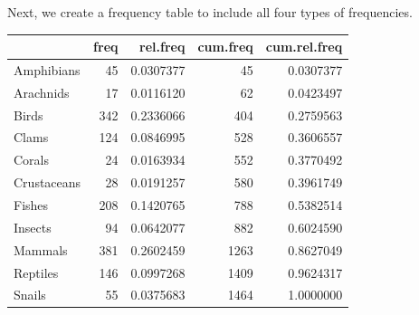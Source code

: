 \documentclass[
]{book}
\newenvironment{Shaded}{\begin{snugshade}}{\end{snugshade}}
\newcommand{\AttributeTok}[1]{\textcolor[rgb]{0.13,0.29,0.53}{#1}}
\newcommand{\CommentTok}[1]{\textcolor[rgb]{0.56,0.35,0.01}{\textit{#1}}}
\newcommand{\FunctionTok}[1]{\textcolor[rgb]{0.13,0.29,0.53}{\textbf{#1}}}
\newcommand{\NormalTok}[1]{#1}
\newcommand{\OtherTok}[1]{\textcolor[rgb]{0.56,0.35,0.01}{#1}}
\newcommand{\SpecialCharTok}[1]{\textcolor[rgb]{0.81,0.36,0.00}{\textbf{#1}}}
\begin{document}
Next, we create a frequency table to include all four types of frequencies.

\begin{Shaded}
\end{Shaded}

\begin{tabular}{l|r|r|r|r}
\hline
  & freq & rel.freq & cum.freq & cum.rel.freq\\
\hline
Amphibians & 45 & 0.0307377 & 45 & 0.0307377\\
\hline
Arachnids & 17 & 0.0116120 & 62 & 0.0423497\\
\hline
Birds & 342 & 0.2336066 & 404 & 0.2759563\\
\hline
Clams & 124 & 0.0846995 & 528 & 0.3606557\\
\hline
Corals & 24 & 0.0163934 & 552 & 0.3770492\\
\hline
Crustaceans & 28 & 0.0191257 & 580 & 0.3961749\\
\hline
Fishes & 208 & 0.1420765 & 788 & 0.5382514\\
\hline
Insects & 94 & 0.0642077 & 882 & 0.6024590\\
\hline
Mammals & 381 & 0.2602459 & 1263 & 0.8627049\\
\hline
Reptiles & 146 & 0.0997268 & 1409 & 0.9624317\\
\hline
Snails & 55 & 0.0375683 & 1464 & 1.0000000\\
\hline
\end{tabular}
\end{document}
